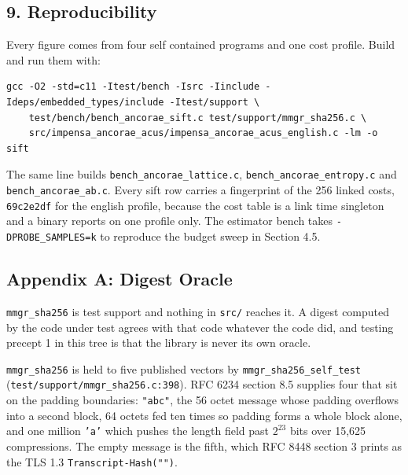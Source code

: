 \subsection{9. Reproducibility}

Every figure comes from four self contained programs and one cost profile. Build and run them with:

\begin{lstlisting}[breaklines=true,breakatwhitespace=false,basicstyle=\ttfamily\small]
gcc -O2 -std=c11 -Itest/bench -Isrc -Iinclude -Ideps/embedded_types/include -Itest/support \
    test/bench/bench_ancorae_sift.c test/support/mmgr_sha256.c \
    src/impensa_ancorae_acus/impensa_ancorae_acus_english.c -lm -o sift
\end{lstlisting}

The same line builds \texttt{bench\_\allowbreak{}ancorae\_\allowbreak{}lattice.\allowbreak{}c}, \texttt{bench\_\allowbreak{}ancorae\_\allowbreak{}entropy.\allowbreak{}c} and \texttt{bench\_\allowbreak{}ancorae\_\allowbreak{}ab.\allowbreak{}c}. Every sift row carries a fingerprint of the 256 linked costs, \texttt{69c2e2df} for the english profile, because the cost table is a link time singleton and a binary reports on one profile only. The estimator bench takes \texttt{-\allowbreak{}DPROBE\_\allowbreak{}SAMPLES=k} to reproduce the budget sweep in Section 4.5.

\subsection{Appendix A: Digest Oracle}

\texttt{mmgr\_\allowbreak{}sha256} is test support and nothing in \texttt{src/\allowbreak{}} reaches it. A digest computed by the code under test agrees with that code whatever the code did, and testing precept 1 in this tree is that the library is never its own oracle.

\texttt{mmgr\_\allowbreak{}sha256} is held to five published vectors by \texttt{mmgr\_\allowbreak{}sha256\_\allowbreak{}self\_\allowbreak{}test} (\texttt{test/\allowbreak{}support/\allowbreak{}mmgr\_\allowbreak{}sha256.\allowbreak{}c:398}). RFC 6234 section 8.5 supplies four that sit on the padding boundaries: \texttt{"abc"}, the 56 octet message whose padding overflows into a second block, 64 octets fed ten times so padding forms a whole block alone, and one million \texttt{'a'} which pushes the length field past \(2^{23}\) bits over 15,625 compressions. The empty message is the fifth, which RFC 8448 section 3 prints as the TLS 1.3 \texttt{Transcript-\allowbreak{}Hash("")}.

